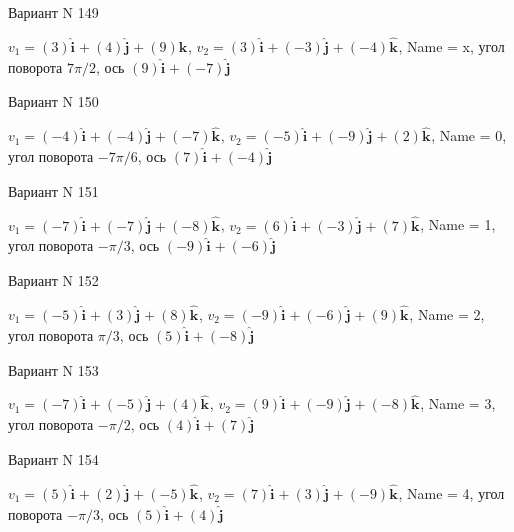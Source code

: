 \documentclass[11pt]{report}
\begin{document}
Вариант N 149

$v_1 = \left(3\right)\mathbf{\hat{i}_{}} + \left(4\right)\mathbf{\hat{j}_{}} + \left(9\right)\mathbf{\hat{k}_{}}$, $v_2 = \left(3\right)\mathbf{\hat{i}_{}} + \left(-3\right)\mathbf{\hat{j}_{}} + \left(-4\right)\mathbf{\hat{k}_{}}$, Name = x, угол поворота $7 \pi / 2$, ось $\left(9\right)\mathbf{\hat{i}_{}} + \left(-7\right)\mathbf{\hat{j}_{}}$

Вариант N 150

$v_1 = \left(-4\right)\mathbf{\hat{i}_{}} + \left(-4\right)\mathbf{\hat{j}_{}} + \left(-7\right)\mathbf{\hat{k}_{}}$, $v_2 = \left(-5\right)\mathbf{\hat{i}_{}} + \left(-9\right)\mathbf{\hat{j}_{}} + \left(2\right)\mathbf{\hat{k}_{}}$, Name = 0, угол поворота $- 7 \pi / 6$, ось $\left(7\right)\mathbf{\hat{i}_{}} + \left(-4\right)\mathbf{\hat{j}_{}}$

Вариант N 151

$v_1 = \left(-7\right)\mathbf{\hat{i}_{}} + \left(-7\right)\mathbf{\hat{j}_{}} + \left(-8\right)\mathbf{\hat{k}_{}}$, $v_2 = \left(6\right)\mathbf{\hat{i}_{}} + \left(-3\right)\mathbf{\hat{j}_{}} + \left(7\right)\mathbf{\hat{k}_{}}$, Name = 1, угол поворота $- \pi / 3$, ось $\left(-9\right)\mathbf{\hat{i}_{}} + \left(-6\right)\mathbf{\hat{j}_{}}$

Вариант N 152

$v_1 = \left(-5\right)\mathbf{\hat{i}_{}} + \left(3\right)\mathbf{\hat{j}_{}} + \left(8\right)\mathbf{\hat{k}_{}}$, $v_2 = \left(-9\right)\mathbf{\hat{i}_{}} + \left(-6\right)\mathbf{\hat{j}_{}} + \left(9\right)\mathbf{\hat{k}_{}}$, Name = 2, угол поворота $\pi / 3$, ось $\left(5\right)\mathbf{\hat{i}_{}} + \left(-8\right)\mathbf{\hat{j}_{}}$

Вариант N 153

$v_1 = \left(-7\right)\mathbf{\hat{i}_{}} + \left(-5\right)\mathbf{\hat{j}_{}} + \left(4\right)\mathbf{\hat{k}_{}}$, $v_2 = \left(9\right)\mathbf{\hat{i}_{}} + \left(-9\right)\mathbf{\hat{j}_{}} + \left(-8\right)\mathbf{\hat{k}_{}}$, Name = 3, угол поворота $- \pi / 2$, ось $\left(4\right)\mathbf{\hat{i}_{}} + \left(7\right)\mathbf{\hat{j}_{}}$

Вариант N 154

$v_1 = \left(5\right)\mathbf{\hat{i}_{}} + \left(2\right)\mathbf{\hat{j}_{}} + \left(-5\right)\mathbf{\hat{k}_{}}$, $v_2 = \left(7\right)\mathbf{\hat{i}_{}} + \left(3\right)\mathbf{\hat{j}_{}} + \left(-9\right)\mathbf{\hat{k}_{}}$, Name = 4, угол поворота $- \pi / 3$, ось $\left(5\right)\mathbf{\hat{i}_{}} + \left(4\right)\mathbf{\hat{j}_{}}$
\end{document}
